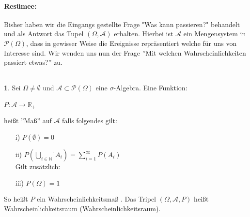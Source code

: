 \documentclass[10pt,a4paper]{report}
\numberwithin{equation}{section}
\numberwithin{figure}{section}
\theoremstyle{plain}
\theoremstyle{definition}
\newtheorem{defn}[thm]{\protect\definitionname}
\theoremstyle{remark}
\theoremstyle{plain}
\providecommand{\definitionname}{Definition}
\newcommand{\1}{ \mathbb{1} } %
\begin{document}
\paragraph{Resümee:}
\label{sec:resumee}
Bisher haben wir die Eingangs gestellte Frage "Was kann passieren?" behandelt und als Antwort das Tupel $(\Omega,\mathcal{A})$ erhalten. Hierbei ist $\mathcal{A}$ ein Mengensystem in $\mathcal{P}(\Omega)$, dass in gewisser Weise die Ereignisse repräsentiert welche für uns von Interesse sind. Wir wenden uns nun der Frage ''Mit welchen Wahrscheinlichkeiten passiert etwas?'' zu.\\\\
\begin{defn}
  Sei $\Omega \neq \emptyset$ und $\mathcal{A}\subset
  \mathcal{P}(\Omega)$ eine $\sigma$-Algebra. Eine
  Funktion:\begin{center} $P: \mathcal{A} \rightarrow \mathbb{R}_+$
  \end{center}
  heißt ''Maß'' auf $\mathcal{A}$ falls folgendes gilt:
  \begin{itemize}
  \item[i)] $P(\emptyset)=0$
  \item[ii)] $P\left(\stackrel{\cdot}{\bigcup\limits_{i \in \mathbb{N}}}A_i\right)=\sum\limits_{i=1}^\infty P(A_i)$\\
    Gilt zusätzlich:
  \item[iii)] $P(\Omega)=1$
  \end{itemize}
  So heißt $P$ ein Wahrscheinlichkeitsmaß .
  Das Tripel $(\Omega,\mathcal{A},P)$ heißt Wahrscheinlichkeitsraum (Wahrscheinlichkeitsraum). 
\end{defn}
\end{document}
